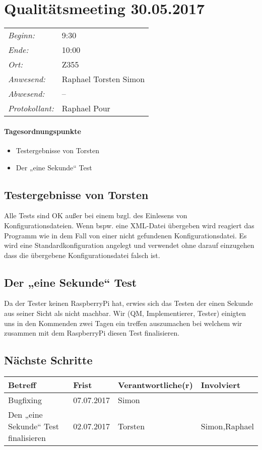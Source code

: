 \documentclass{scrartcl}
\date{30.05.2017}	%
\begin{document}
\maketitle
\section{Qualitätsmeeting 30.05.2017}	%
\begin{tabular}[t]{p{.25\linewidth} p{.25\linewidth}}
\emph{Beginn:}				& 9:30\\
\emph{Ende:}					& 10:00\\
\emph{Ort:}						& Z355\\
\emph{Anwesend:}	& 
Raphael\newline
Torsten\newline
Simon
\\
\emph{Abwesend:}	& 
--
\\
\emph{Protokollant:}& Raphael Pour
\end{tabular}
\paragraph{Tagesordnungspunkte}
\begin{itemize}
    \item Testergebnisse von Torsten
    \item Der „eine Sekunde“ Test
\end{itemize}

\subsection{Testergebnisse von Torsten}
Alle Tests sind OK außer bei einem bzgl. des Einlesens von Konfigurationsdateien. Wenn bspw. eine XML-Datei übergeben wird reagiert das Programm wie in dem Fall von einer nicht gefundenen Konfigurationsdatei. Es wird eine Standardkonfiguration angelegt und verwendet ohne darauf einzugehen dass die übergebene Konfigurationsdatei falsch ist. 

\subsection{Der „eine Sekunde“ Test}
Da der Tester keinen RaspberryPi hat, erwies sich das Testen der einen Sekunde aus seiner Sicht als nicht machbar. Wir (QM, Implementierer, Tester) einigten uns in den Kommenden zwei Tagen ein treffen auszumachen bei welchem wir zusammen mit dem RaspberryPi diesen Test finalisieren.

\subsection{Nächste Schritte}
\begin{tabular}{L{.249} L{.2} L{.25} L{.25}}
Betreff & Frist & Verantwortliche(r) & Involviert\\\hline
Bugfixing&07.07.2017&Simon\\\hline
Den „eine Sekunde“ Test finalisieren&02.07.2017&Torsten&Simon,Raphael\\
\end{tabular}
\end{document}
